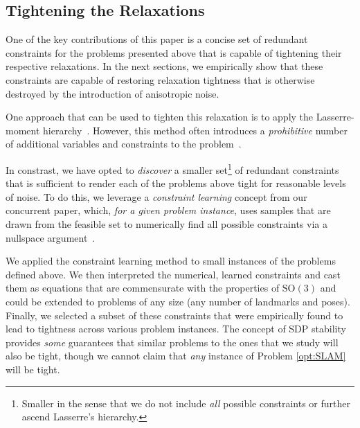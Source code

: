 \documentclass[lettersize,journal]{IEEEtran}
\begin{document}
\subsection{Tightening the Relaxations}\label{sec:Tightening}

One of the key contributions of this paper is a concise set of redundant constraints for the problems presented above that is capable of tightening their respective relaxations. In the next sections, we empirically show that these constraints are capable of restoring relaxation tightness that is otherwise destroyed by the introduction of anisotropic noise.

One approach that can be used to tighten this relaxation is to apply the Lasserre-moment hierarchy~\cite{henrionMomentSOSHierarchyLectures2021, lasserreGlobalOptimizationPolynomials2001}. However, this method often introduces a \emph{prohibitive} number of additional  variables and constraints to the problem~\cite{yangCertifiablyOptimalOutlierRobust2023}. 

In constrast, we have opted to \emph{discover} a smaller set\footnote{Smaller in the sense that we do not include \emph{all} possible constraints or further ascend Lasserre's hierarchy.} of redundant constraints that is sufficient to render each of the problems above tight for reasonable levels of noise.  To do this, we leverage a \emph{constraint learning} concept from our concurrent paper, which, \emph{for a given problem instance}, uses samples that are drawn from the feasible set to numerically find all possible constraints via a nullspace argument~\cite{dumbgenGloballyOptimalState2023a}. 

We applied the constraint learning method to small instances of the problems defined above. We then interpreted the numerical, learned constraints and cast them as equations that are commensurate with the properties of $\mbox{SO}(3)$ and could be extended to problems of any size (any number of landmarks and poses). Finally, we selected a subset of these constraints that were empirically found to lead to tightness across various problem instances. The concept of SDP stability~\cite{cifuentesLocalStabilitySemidefinite2022} provides \emph{some} guarantees that similar problems to the ones that we study will also be tight, though we cannot claim that \emph{any} instance of Problem \eqref{opt:SLAM} will be tight.
\end{document}
